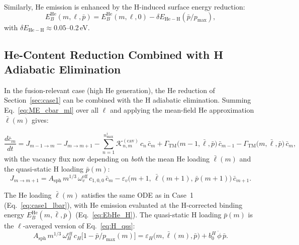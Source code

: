 Similarly, He emission is enhanced by the H-induced surface energy
reduction:
\begin{equation}\label{eq:EbHe_H}
    E_B^{\mathrm{He}}(m,\ell,\bar{p})
    = E_B^{\mathrm{He}}(m,\ell,0)
    - \delta E_{\mathrm{He-H}}(\bar{p}/p_{\max}),
\end{equation}
with $\delta E_{\mathrm{He-H}} \approx 0.05$--0.2\,eV.

\subsection{He-Content Reduction Combined with H Adiabatic Elimination}
\label{sec:H_combined}

In the fusion-relevant case (high He generation), the He reduction of
Section~\ref{sec:case1} can be combined with the H adiabatic
elimination.  Summing Eq.~\eqref{eq:ME_cbar_ml} over all $\ell$ and
applying the mean-field He approximation $\bar{\ell}(m)$ gives:

\begin{equation}\label{eq:ME_cbar_m_H}
\frac{d\bar{c}_m}{dt}
= J_{m-1 \to m} - J_{m \to m+1}
  - \sum_{n=1}^{n_{\max}^i}
    \mathcal{K}_{n,m}^{(\mathrm{cav})}\,c_n\,\bar{c}_m
  + \Gamma_{\mathrm{TM}}\bigl(m{-}1,\bar{\ell},\bar{p}\bigr)\,\bar{c}_{m-1}
  - \Gamma_{\mathrm{TM}}\bigl(m,\bar{\ell},\bar{p}\bigr)\,\bar{c}_m,
\end{equation}
with the vacancy flux now depending on \emph{both} the mean He loading
$\bar{\ell}(m)$ and the quasi-static H loading $\bar{p}(m)$:
\begin{equation}
    J_{m \to m+1}
    = A_{\mathrm{sph}}\,m^{1/3}\,\omega_v^{\mathrm{eff}}\,
      c_{1,0,0}\,\bar{c}_m
    - \varepsilon_v\bigl(m{+}1,\,\bar{\ell}(m{+}1),\,\bar{p}(m{+}1)\bigr)\,
      \bar{c}_{m+1}.
\end{equation}

The He loading $\bar{\ell}(m)$ satisfies the same ODE as in
Case~1 (Eq.~\ref{eq:case1_lbar}), with He emission evaluated at the
H-corrected binding energy $E_B^{\mathrm{He}}(m,\bar{\ell},\bar{p})$
(Eq.~\ref{eq:EbHe_H}).  The quasi-static H loading $\bar{p}(m)$ is
the $\ell$-averaged version of Eq.~\eqref{eq:H_qss}:
\begin{equation}\label{eq:H_qss_combined}
    A_{\mathrm{sph}}\,m^{1/3}\,\omega_H^{\mathrm{eff}}\,c_H
    \bigl[1 - \bar{p}/p_{\max}(m)\bigr]
    = \varepsilon_H\bigl(m,\bar{\ell}(m),\bar{p}\bigr)
    + b_0^H\,\dot{\phi}\,\bar{p}.
\end{equation}

